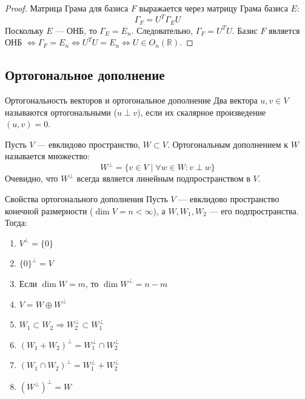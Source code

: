 \begin{proof}
	Матрица Грама для базиса $F$ выражается через матрицу Грама базиса $E$:
	\[
	\Gamma_F = U^T \Gamma_E U
	\]
	Поскольку $E$ — ОНБ, то $\Gamma_E = E_n$. Следовательно, $\Gamma_F = U^T U$. 
	Базис $F$ является ОНБ $\Leftrightarrow \Gamma_F = E_n \Leftrightarrow U^T U = E_n \Leftrightarrow U \in O_n(\mathbb{R})$.
\end{proof}

\subsection{Ортогональное дополнение}

\begin{Definition}{Ортогональность векторов и ортогональное дополнение}{}
	Два вектора $u, v \in V$ называются ортогональными ($u \perp v$), если их скалярное произведение $(u, v) = 0$.
	
	Пусть $V$ — евклидово пространство, $W \subset V$. Ортогональным дополнением к $W$ называется множество:
	\[
	W^\perp = \{v \in V \mid \forall w \in W: v \perp w\}
	\]
	Очевидно, что $W^\perp$ всегда является линейным подпространством в $V$.
\end{Definition}

\begin{Statement}{Свойства ортогонального дополнения}{}
	Пусть $V$ — евклидово пространство конечной размерности ($\dim V = n < \infty$), а $W, W_1, W_2$ — его подпространства. Тогда:
	\begin{enumerate}
		\item $V^\perp = \{0\}$
		\item $\{0\}^\perp = V$
		\item Если $\dim W = m$, то $\dim W^\perp = n - m$
		\item $V = W \oplus W^\perp$
		\item $W_1 \subset W_2 \Rightarrow W_2^\perp \subset W_1^\perp$
		\item $(W_1 + W_2)^\perp = W_1^\perp \cap W_2^\perp$
		\item $(W_1 \cap W_2)^\perp = W_1^\perp + W_2^\perp$
		\item $(W^\perp)^\perp = W$
	\end{enumerate}
\end{Statement}

